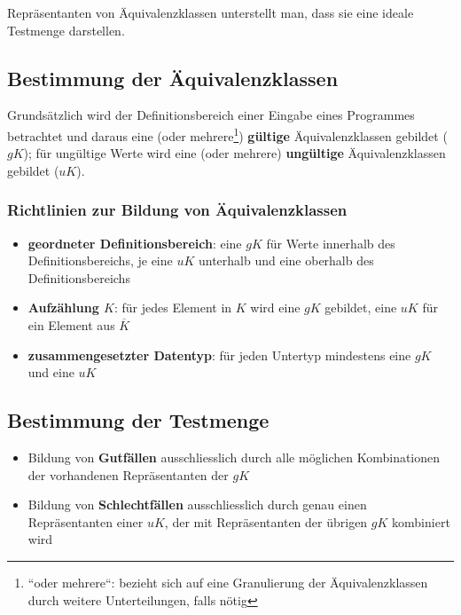 \vspace{5mm}
\begin{tcolorbox}[title={Ideale Testmenge}]
    Repräsentanten von Äquivalenzklassen unterstellt man, dass sie eine ideale Testmenge darstellen.
\end{tcolorbox}

\subsection*{Bestimmung der Äquivalenzklassen}

Grundsätzlich wird der Definitionsbereich einer Eingabe eines Programmes betrachtet und daraus eine (oder mehrere\footnote{
``oder mehrere``: bezieht sich auf eine Granulierung der Äquivalenzklassen durch weitere Unterteilungen, falls nötig
}) \textbf{gültige} Äquivalenzklassen gebildet ($gK$); für ungültige Werte wird eine (oder mehrere) \textbf{ungültige} Äquivalenzklassen gebildet ($uK$).\\

\subsubsection*{Richtlinien zur Bildung von Äquivalenzklassen}

\begin{itemize}
    \item \textbf{geordneter Definitionsbereich}: eine $gK$ für Werte innerhalb des Definitionsbereichs, je eine $uK$ unterhalb und eine oberhalb des Definitionsbereichs
    \item \textbf{Aufzählung $K$}: für jedes Element in $K$ wird eine $gK$ gebildet, eine $uK$ für ein Element aus $\overline{K}$
    \item \textbf{zusammengesetzter Datentyp}: für jeden Untertyp mindestens eine $gK$ und eine $uK$
\end{itemize}

\subsection*{Bestimmung der Testmenge}

\begin{itemize}
    \item Bildung von \textbf{Gutfällen} ausschliesslich durch alle möglichen Kombinationen der vorhandenen Repräsentanten der $gK$
    \item Bildung von \textbf{Schlechtfällen} ausschliesslich durch genau einen Repräsentanten einer $uK$, der mit Repräsentanten der übrigen $gK$ kombiniert wird
\end{itemize}

